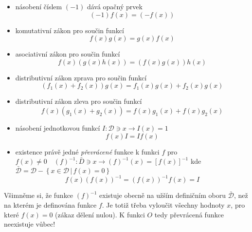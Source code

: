 \begin{itemize}[noitemsep]
\begin{equation}
          \end{equation}
        \item násobení číslem \((-1)\) dává opačný prvek
          \begin{equation}\label{mai:eq020}
            (-1)f(x)=(-f(x))
          \end{equation}
        \item komutativní zákon pro součin funkcí
          \begin{equation}\label{mai:eq021}
            f(x)g(x)=g(x)f(x)
          \end{equation}
        \item asociativní zákon pro součin funkcí 
          \begin{equation}\label{mai:eq022}
            f(x)(g(x)h(x))=(f(x)g(x))h(x)
          \end{equation}
        \item distributivní zákon zprava pro součin funkcí
          \begin{equation}\label{mai:eq023}
            (f_1(x) + f_2(x))g(x) =f_1(x)g(x) + f_2(x)g(x)
          \end{equation}
        \item distributivní zákon zleva pro součin funkcí
          \begin{equation}\label{mai:eq024}
            f(x)(g_1(x) + g_2(x))=f(x)g_1(x)+f(x)g_2(x)
          \end{equation}
        \item násobení jednotkovou funkcí \(I: \mathcal{D}\ni x \rightarrow I(x) = 1\)  
          \begin{equation}\label{mai:eq025}
           f(x)I=If(x)
          \end{equation}
        \item existence právě jedné \emph{převrácené} funkce k funkci \(f\) pro \(f(x)\neq0\quad 
              (f)^{-1}: \bar{D}\ni x\rightarrow (f)^{-1}(x)=[f(x)]^{-1}\) kde \(\bar{\mathcal{D}} 
              = \mathcal{D} - \left\{x\in \mathcal{D}\,\lvert\,f(x)=0\right\}\)
          \begin{equation}
            f(x)(f(x))^{-1}=(f(x))^{-1}f(x) = I
          \end{equation}
      \end{itemize}
      Všimněme si, že funkce \((f)^{-1}\) existuje obecně na užším definičním oboru 
      \(\bar{\mathcal{D}}\), než na kterém je definována funkce \(f\). Je totiž třeba vyloučit 
      všechny hodnoty \(x\), pro které \(f(x) = 0\) (zákaz dělení nulou). K funkci \(O\) tedy 
      převrácená funkce neexistuje vůbec!
      
